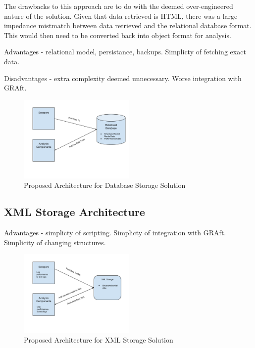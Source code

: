 The drawbacks to this approach are to do with the deemed over-engineered nature of the solution. Given that data retrieved is HTML, there was a large impedance mistmatch between data retrieved and the relational database format. This would then need to be converted back into object format for analysis. 


Advantages - relational model, persistance, backups. Simplicty of fetching exact data.

Disadvantages - extra complexity deemed unnecessary. Worse integration with GRAft. 

\begin{figure}[h!]
 \centering
 \includegraphics[width=0.5\textwidth]{Images/Database_Architecture.pdf}
 \caption{Proposed Architecture for Database Storage Solution}
\end{figure}

\subsection{XML Storage Architecture}

Advantages - simplicty of scripting. Simplicty of integration with GRAft. Simplicity of changing structures. 

\begin{figure}[h!]
\centering
\includegraphics[width=0.5\textwidth]{Images/XML_Storage_Architecture.pdf}
\caption{Proposed Architecture for XML Storage Solution}
\end{figure}

